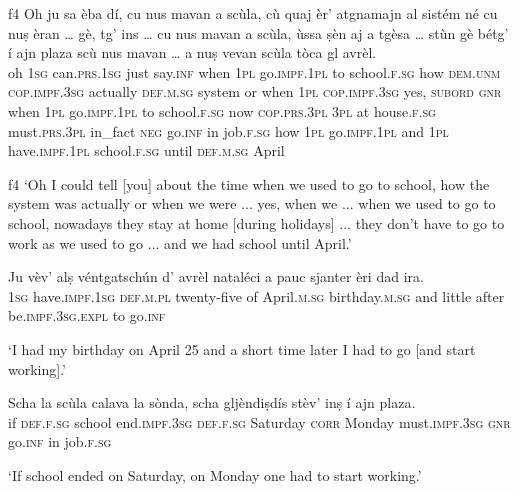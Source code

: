 \begin{linenumbers}
	\gll {\ob}f4{\cb} Oh ju sa èba dí, cu nus mavan a scùla, cù quaj èr’ atgnamajn al sistém né cu nuṣ èran … gè, tg’ ins … cu nus mavan a scùla, ùssa ṣèn aj a tgèsa … stùn gè bétg’ í ajn plaza scù nus mavan … a nuṣ vevan scùla tòca gl avrèl.   \\
	 {} oh \textsc{1sg} can.\textsc{prs.1sg} just say.\textsc{inf} when \textsc{1pl} go.\textsc{impf.1pl} to school.\textsc{f.sg} how \textsc{dem.unm} \textsc{cop.impf.3sg} actually \textsc{def.m.sg} system or when \textsc{1pl} \textsc{cop.impf.3sg} {} yes, \textsc{subord} \textsc{gnr} {} when \textsc{1pl} go.\textsc{impf.1pl} to school.\textsc{f.sg} now \textsc{cop.prs.3pl} \textsc{3pl} at house.\textsc{f.sg} {} must.\textsc{prs.3pl} in\_fact \textsc{neg} go.\textsc{inf} in job.\textsc{f.sg} how \textsc{1pl} go.\textsc{impf.1pl} {} and \textsc{1pl} have.\textsc{impf.1pl} school.\textsc{f.sg} until \textsc{def.m.sg} April\\
\end{linenumbers}
\medskip
\glt {\ob}f4{\cb} `Oh I could tell [you] about the time when we used to go to school, how the system was actually or when we were ... yes, when we ... when we used to go to school, nowadays they stay at home [during holidays] ... they don't have to go to work as we used to go ... and we had school until April.'
\medskip

\begin{linenumbers}
	\gll Ju vèv’ alṣ véntgatschún d’ avrèl nataléci a pauc sjanter èri dad ira.   \\
	\textsc{1sg} have.\textsc{impf.1sg} \textsc{def.m.pl} twenty-five of April.\textsc{m.sg} birthday.\textsc{m.sg} and little after be.\textsc{impf.3sg.expl} to go.\textsc{inf}\\
\end{linenumbers}
\medskip
\glt `I had my birthday on April 25 and a short time later I had to go [and start working].'
\medskip

\begin{linenumbers}
	\gll Scha la scùla calava la sònda, scha gljèndiṣdís stèv’ inṣ í ajn plaza.   \\
	if \textsc{def.f.sg} school end.\textsc{impf.3sg} \textsc{def.f.sg} Saturday \textsc{corr} Monday must.\textsc{impf.3sg} \textsc{gnr} go.\textsc{inf} in job.\textsc{f.sg}\\
\end{linenumbers}
\medskip
\glt `If school ended on Saturday, on Monday one had to start working.'
\medskip

